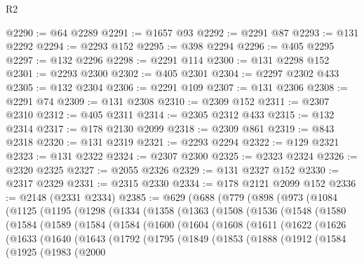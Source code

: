 \begin{lexlean}{R2}
\begin{coremodule}
@2290 := @64 @2289
@2291 := @1657 @93
@2292 := @2291 @87
@2293 := @131 @2292
@2294 := @2293 @152
@2295 := @398 @2294
@2296 := @405 @2295
@2297 := @132 @2296
@2298 := @2291 @114
@2300 := @131 @2298 @152
@2301 := @2293 @2300
@2302 := @405 @2301
@2304 := @2297 @2302 @433
@2305 := @132 @2304
@2306 := @2291 @109
@2307 := @131 @2306
@2308 := @2291 @74
@2309 := @131 @2308
@2310 := @2309 @152
@2311 := @2307 @2310
@2312 := @405 @2311
@2314 := @2305 @2312 @433
@2315 := @132 @2314
@2317 := @178 @2130 @2099
@2318 := @2309 @861
@2319 := @843 @2318
@2320 := @131 @2319
@2321 := @2293 @2294
@2322 := @129 @2321
@2323 := @131 @2322
@2324 := @2307 @2300
@2325 := @2323 @2324
@2326 := @2320 @2325
@2327 := @2055 @2326
@2329 := @131 @2327 @152
@2330 := @2317 @2329
@2331 := @2315 @2330
@2334 := @178 @2121 @2099 @152
@2336 := @2148 (@2331 @2334)
@2385 := @629
    (@688
      (@779
        (@898
          (@973
            (@1084
              (@1125
                (@1195
                  (@1298
                    (@1334
                      (@1358
                        (@1363
                          (@1508
                            (@1536
                              (@1548
                                (@1580
                                  (@1584
                                    (@1589
                                      (@1584
                                        (@1584
                                          (@1600
                                            (@1604
                                              (@1608
                                                (@1611
                                                  (@1622
                                                    (@1626
                                                      (@1633
                                                        (@1640
                                                          (@1643
                                                            (@1792
                                                              (@1795
                                                                (@1849
                                                                  (@1853
                                                                    (@1888
                                                                      (@1912
                                                                        (@1584
                                                                          (@1925
                                                                            (@1983
                                                                              (@2000

\end{coremodule}
\end{lexlean}
